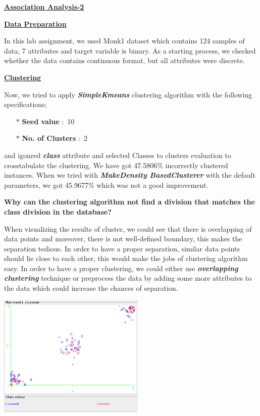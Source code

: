 \documentclass[a4paper,10pt]{article}
\begin{document}
\begin{center}
	\large\textbf{\underline{Association Analysis-2}} \par
\end{center} \par
\textbf{\underline{Data Preparation}} \par
In this lab assignment, we used Monk1 dataset which contains 124 samples of data, 7 attributes and target 
variable is binary. As a starting process, we checked whether the data contains continuous format, but all
attributes were discrete.  \par
\textbf{\underline{Clustering}} \par
Now, we tried to apply \textbf{\textit{SimpleKmeans}} clustering algorithm with the following specifications;
\begin{enumerate}
  \item[$*$] \textbf{Seed value} $:$ 10
  \item[$*$] \textbf{No. of Clusters} $:$ 2 
\end{enumerate}
and igonred \textbf{\textit{class}} attribute and selected Classes to clusters evaluation to crosstabulate the 
clustering. We have got 47.5806\% incorrectly clustered instances. When we tried with \textbf{\textit{MakeDensity
BasedClusterer}} with the default parameters, we got 45.9677\% which was not a good improvement.
\par
\textbf{Why can the clustering algorithm not find a division that matches the class division in the database?} \par
When visualizing the results of cluster, we could see that there is overlapping of data points and moreover,
there is not well-defined boundary, this makes the separation tedious. In order to have a proper separation,
similar data points should lie close to each other, this would make the jobs of clustering algorithm easy.
In order to have a proper clustering, we could either use \textbf{\textit{overlapping clustering}} technique
or preprocess the data by adding some more attributes to the data which could increase the chances of separation.
\begin{center}
  \includegraphics[width=70mm,scale=0.10]{Clustering_Visualization.png}
\end{center}
\end{document}
